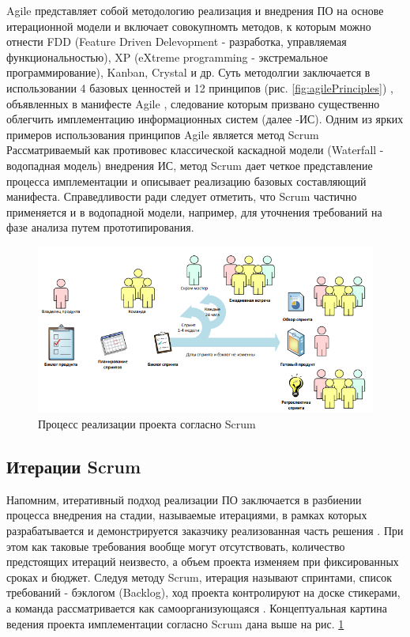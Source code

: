 \documentclass[12pt]{article}
\begin{document}
Agile представляет собой методологию реализация и внедрения ПО на основе итерационной модели и включает
совокупномть методов, к которым можно отнести FDD (Feature Driven Delevopment - разработка, управляемая 
функциональностью), XP (eXtreme programming - экстремальное программирование), Kanban, Crystal и др. 
Суть методолгии заключается в использовании 4 базовых ценностей и 12 принципов (рис. \ref{fig:agilePrinciples}) , 
объявленных в манифесте Agile \cite{agileManifest}, следование которым призвано существенно облегчить имплементацию 
информационных систем (далее -ИС). Одним из ярких примеров использования принципов Agile является метод Scrum 
Рассматриваемый как противовес классической каскадной модели (Waterfall - водопадная модель) внедрения ИС, 
метод Scrum дает четкое представление процесса имплементации и описывает реализацию базовых составляющий 
манифеста. Справедливости ради следует отметить, что Scrum частично применяется и в водопадной модели, например,
для уточнения требований на фазе анализа путем прототипирования.

\begin{figure}
  \centering
  \includegraphics[width=1\textwidth]{./figures/ScrumRealizationChart.png}
  \caption{\label{fig:scrumRealizationChart}Процесс реализации проекта согласно Scrum}
\end{figure}

\subsection{Итерации Scrum}

Напомним, итеративный подход реализации ПО заключается в разбиении процесса внедрения на стадии, называемые итерациями, 
в рамках которых разрабатывается и демонстрируется заказчику реализованная часть решения \cite{InfoSysImplementation}. При этом 
как таковые требования вообще могут отсутствовать, количество предстоящих итераций неизвесто, а объем
проекта изменяем при фиксированных сроках и бюджет. Следуя методу Scrum, итерация называют спринтами, список 
требований - бэклогом (Backlog), ход проекта контролируют на доске стикерами, а команда рассматривается как 
самоорганизующаяся \cite{AgilePrinciples}. Концептуальная картина ведения проекта имплементации согласно Scrum дана выше 
на рис. \ref{fig:scrumRealizationChart}
\end{document}
